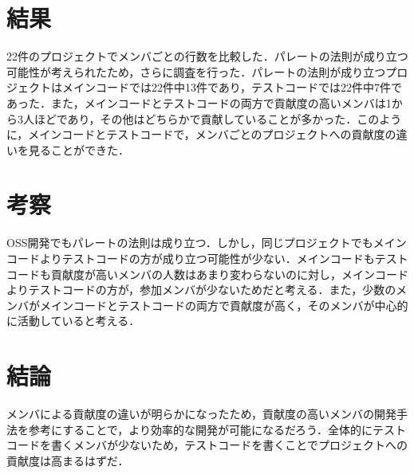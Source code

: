 \documentclass[uplatex,twocolumn,dvipdfmx]{jsarticle}
\begin{document}
\section{結果}

22件のプロジェクトでメンバごとの行数を比較した．パレートの法則が成り立つ可能性が考えられたため，さらに調査を行った．パレートの法則が成り立つプロジェクトはメインコードでは22件中13件であり，テストコードでは22件中7件であった．また，メインコードとテストコードの両方で貢献度の高いメンバは1から3人ほどであり，その他はどちらかで貢献していることが多かった．このように，メインコードとテストコードで，メンバごとのプロジェクトへの貢献度の違いを見ることができた．


\section{考察}

OSS開発でもパレートの法則は成り立つ．しかし，同じプロジェクトでもメインコードよりテストコードの方が成り立つ可能性が少ない．メインコードもテストコードも貢献度が高いメンバの人数はあまり変わらないのに対し，メインコードよりテストコードの方が，参加メンバが少ないためだと考える．また，少数のメンバがメインコードとテストコードの両方で貢献度が高く，そのメンバが中心的に活動していると考える．


\section{結論}

メンバによる貢献度の違いが明らかになったため，貢献度の高いメンバの開発手法を参考にすることで，より効率的な開発が可能になるだろう．全体的にテストコードを書くメンバが少ないため，テストコードを書くことでプロジェクトへの貢献度は高まるはずだ．



\end{document}
